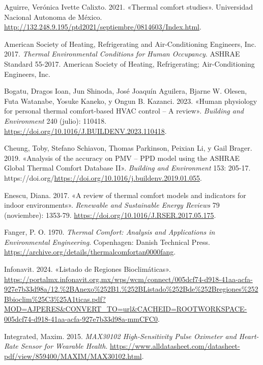 \documentclass[
  letterpaper,
  DIV=11,
  numbers=noendperiod]{scrreport}
\newlength{\cslhangindent}
\newenvironment{CSLReferences}[2] %
 {\begin{list}{}{%
  \setlength{\itemindent}{0pt}
  \setlength{\leftmargin}{0pt}
  \setlength{\parsep}{0pt}
  \ifodd #1
   \setlength{\leftmargin}{\cslhangindent}
   \setlength{\itemindent}{-1\cslhangindent}
  \fi
  \setlength{\itemsep}{#2\baselineskip}}}
 {\end{list}}
\begin{document}
\label{refs}
\begin{CSLReferences}{1}{0}
Aguirre, Verónica Ivette Calixto. 2021. {«Thermal comfort studies»}.
Universidad Nacional Autonoma de México.
\url{http://132.248.9.195/ptd2021/septiembre/0814603/Index.html}.

American Society of Heating, Refrigerating and Air-Conditioning
Engineers, Inc. 2017. \emph{Thermal Environmental Conditions for Human
Occupancy}. ASHRAE Standard 55-2017. American Society of Heating,
Refrigerating; Air-Conditioning Engineers, Inc.

Bogatu, Dragos Ioan, Jun Shinoda, José Joaquín Aguilera, Bjarne W.
Olesen, Futa Watanabe, Yosuke Kaneko, y Ongun B. Kazanci. 2023. {«Human
physiology for personal thermal comfort-based HVAC control -- A
review»}. \emph{Building and Environment} 240 (julio): 110418.
\url{https://doi.org/10.1016/J.BUILDENV.2023.110418}.

Cheung, Toby, Stefano Schiavon, Thomas Parkinson, Peixian Li, y Gail
Brager. 2019. {«Analysis of the accuracy on PMV -- PPD model using the
ASHRAE Global Thermal Comfort Database II»}. \emph{Building and
Environment} 153: 205-17.
https://doi.org/\url{https://doi.org/10.1016/j.buildenv.2019.01.055}.

Enescu, Diana. 2017. {«A review of thermal comfort models and indicators
for indoor environments»}. \emph{Renewable and Sustainable Energy
Reviews} 79 (noviembre): 1353-79.
\url{https://doi.org/10.1016/J.RSER.2017.05.175}.

Fanger, P. O. 1970. \emph{Thermal Comfort: Analysis and Applications in
Environmental Engineering}. Copenhagen: Danish Technical Press.
\url{https://archive.org/details/thermalcomfortan0000fang}.

Infonavit. 2024. {«Listado de Regiones Bioclimáticas»}.
\url{https://portalmx.infonavit.org.mx/wps/wcm/connect/005dcf74-d918-41aa-acfa-927e7b33d98a/12.\%2BAnexo\%252B1.\%252BListado\%252Bde\%252Bregiones\%252Bbioclim\%25C3\%25A1ticas.pdf?MOD=AJPERES&CONVERT_TO=url&CACHEID=ROOTWORKSPACE-005dcf74-d918-41aa-acfa-927e7b33d98a-mmCFC0}.

Integrated, Maxim. 2015. \emph{MAX30102 High-Sensitivity Pulse Oximeter
and Heart-Rate Sensor for Wearable Health}.
\url{https://www.alldatasheet.com/datasheet-pdf/view/859400/MAXIM/MAX30102.html}.


\end{CSLReferences}
\end{document}
